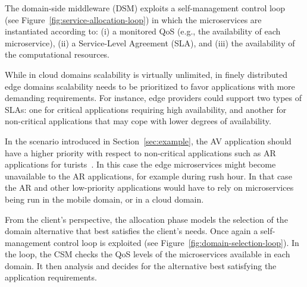 The domain-side middleware (DSM) exploits a self-management control loop~\cite{kephart2003vision} (see Figure~\ref{fig:service-allocation-loop}) in which the microservices are instantiated according to: (i) a monitored QoS (e.g., the availability of each microservice), (ii) a Service-Level Agreement (SLA), and (iii) the availability of the computational resources. 



While in cloud domains scalability is virtually unlimited, in finely distributed edge domains scalability needs to be prioritized to favor applications with more demanding requirements. For instance, edge providers could support two types of SLAs: one for critical applications requiring high availability, and another for non-critical applications that may cope with lower degrees of availability.  

In the scenario introduced in Section~\ref{sec:example}, the AV application should have a higher priority with respect to non-critical applications such as AR applications for turists~\cite{GarrigaMendonca2017}. In this case the edge microservices might become unavailable to the AR applications, for example during rush hour. In that case the AR and other low-priority applications would have to rely on microservices being run in the mobile domain, or in a cloud domain.


From the client's perspective, the allocation phase models the selection of the domain alternative that best satisfies the client's needs. Once again a self-management control loop is exploited (see Figure~\ref{fig:domain-selection-loop}). In the loop, the CSM checks the QoS levels of the microservices available in each domain. It then analysis and decides for the alternative best satisfying the application requirements.


